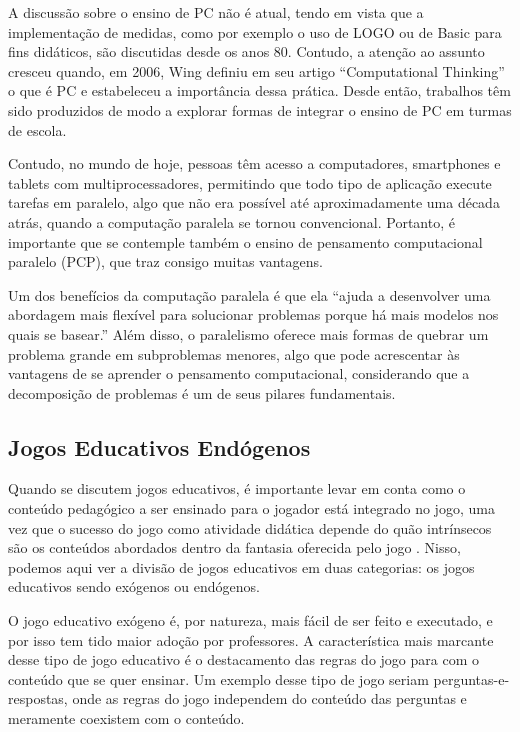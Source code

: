 \documentclass[conference]{IEEEtran}
\begin{document}
A discussão sobre o ensino de PC não é atual, tendo em vista que a implementação de medidas, como por exemplo o uso de LOGO ou de Basic para fins didáticos, são discutidas desde os anos 80\cite{b9}. Contudo, a atenção ao assunto cresceu quando, em 2006, Wing definiu em seu artigo “Computational Thinking” o que é PC e estabeleceu a importância dessa prática. Desde então, trabalhos têm sido produzidos de modo a explorar formas de integrar o ensino de PC em turmas de escola\cite{b1}\cite{b10}\cite{b11}\cite{b12}.

Contudo, no mundo de hoje, pessoas têm acesso a computadores, smartphones e tablets com multiprocessadores, permitindo que todo tipo de aplicação execute tarefas em paralelo, algo que não era possível até aproximadamente uma década atrás, quando a computação paralela se tornou convencional.  Portanto, é importante que se contemple também o ensino de pensamento computacional paralelo (PCP),  que traz consigo muitas vantagens\cite{b5}.

Um dos benefícios da computação paralela é que ela “ajuda a desenvolver uma abordagem mais flexível para solucionar problemas porque há mais modelos nos quais se basear.”\cite{b5} Além disso, o paralelismo oferece mais formas de quebrar um problema grande em subproblemas menores, algo que pode acrescentar às vantagens de se aprender o pensamento computacional, considerando que a decomposição de problemas é um de seus pilares fundamentais\cite{b5}.

\subsection{Jogos Educativos Endógenos}

Quando se discutem jogos educativos, é importante levar em conta como o conteúdo pedagógico a ser ensinado para o jogador está integrado no jogo, uma vez que o sucesso do jogo como atividade didática depende do quão intrínsecos são os conteúdos abordados dentro da fantasia oferecida pelo jogo \cite{b13}. Nisso, podemos aqui ver a divisão de jogos educativos em duas categorias: os jogos educativos sendo exógenos ou endógenos\cite{b14}.

O jogo educativo exógeno é, por natureza, mais fácil de ser feito e executado, e por isso tem tido maior adoção por professores.\cite{b14} A característica mais marcante desse tipo de jogo educativo é o destacamento das regras do jogo para com o conteúdo que se quer ensinar.  Um exemplo desse tipo de jogo seriam perguntas-e-respostas, onde as regras do jogo independem do conteúdo das perguntas e meramente coexistem com o conteúdo.
\end{document}

